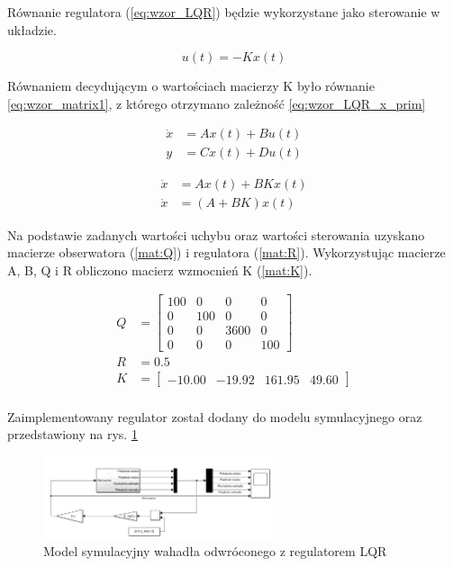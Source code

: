 \documentclass[12pt]{article}
\numberwithin{equation}{section}
\begin{document}
Równanie regulatora (\ref{eq:wzor_LQR}) będzie wykorzystane jako sterowanie w układzie.

\begin{equation}
    u(t) = -Kx(t)
    \label{eq:wzor_LQR}
\end{equation}

Równaniem decydującym o wartościach macierzy K było równanie \ref{eq:wzor_matrix1}, z którego otrzymano zależność \ref{eq:wzor_LQR_x_prim}

\begin{align}
    \dot{x} &= Ax(t) + Bu(t) \label{eq:wzor_matrix1}\\
    y &= Cx(t) + Du(t) \label{eq:wzor_matrix2}
\end{align}

\begin{align}
\label{eq:wzor_LQR_x_prim}
    \dot{x} &= Ax(t) + BKx(t)\\
    \dot{x} &= (A + BK) x(t)
\end{align}

Na podstawie zadanych wartości uchybu oraz wartości sterowania uzyskano macierze obserwatora (\ref{mat:Q}) i regulatora (\ref{mat:R}). Wykorzystując macierze A, B, Q i R obliczono macierz wzmocnień K (\ref{mat:K}).

\begin{align}
    Q &= \begin{bmatrix} 
    100 & 0 & 0 & 0\\
    0 & 100 & 0 & 0\\
    0 & 0 & 3600 & 0\\
    0 & 0 & 0 & 100\end{bmatrix} \label{mat:Q}\\
    R &= 0.5 \label{mat:R} \\
    K &= \begin{bmatrix}
    -10.00 & -19.92 & 161.95 & 49.60\end{bmatrix} \label{mat:K} \\
\end{align}

Zaimplementowany regulator został dodany do modelu symulacyjnego oraz przedstawiony na rys. \ref{fig:lqr}

\begin{figure}[H]
    \centering
    \includegraphics[width=0.6\textwidth]{lqr.png}
    \caption{Model symulacyjny wahadła odwróconego z regulatorem LQR}
    \label{fig:lqr}
\end{figure}
\end{document}
